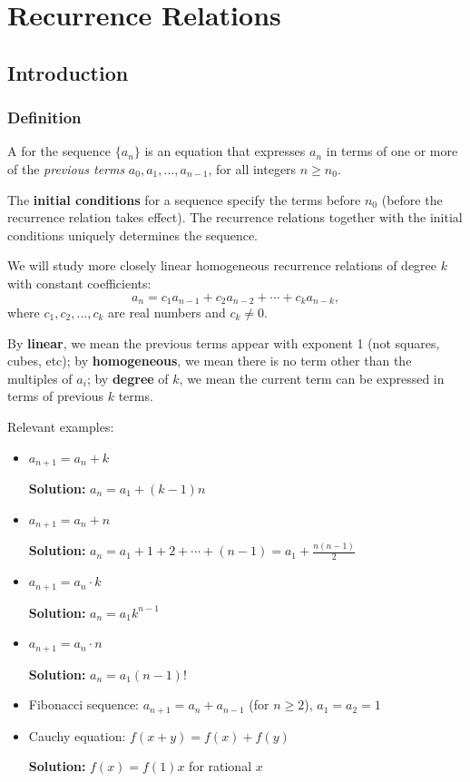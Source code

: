 \chapter{Recurrence Relations}

\section{Introduction}
\subsection{Definition}
\begin{definition}
A  for the sequence $\{a_n\}$ is an equation that expresses $a_n$ in terms of one or more of the \emph{previous terms} $a_0,a_1,\dots,a_{n-1}$, for all integers $n\ge n_0$.
\end{definition}

The \textbf{initial conditions} for a sequence specify the terms before $n_0$ (before the recurrence relation takes effect). The recurrence relations together with the initial conditions uniquely determines the sequence.

We will study more closely linear homogeneous recurrence relations of degree $k$ with constant coefficients:
\[ a_n=c_1a_{n-1}+c_2a_{n-2}+\cdots+c_ka_{n-k}, \]
where $c_1,c_2,\dots,c_k$ are real numbers and $c_k \neq 0$.

By \textbf{linear}, we mean the previous terms appear with exponent 1 (not squares, cubes, etc); by \textbf{homogeneous}, we mean there is no term other than the multiples of $a_i$; by \textbf{degree} of $k$, we mean the current term can be expressed in terms of previous $k$ terms.

Relevant examples:
\begin{itemize}
\item $a_{n+1}=a_n+k$

\textbf{Solution:} $a_n=a_1+(k-1)n$

\item $a_{n+1}=a_n+n$

\textbf{Solution:} $a_n=a_1+1+2+\cdots+(n-1)=a_1+\frac{n(n-1)}{2}$

\item $a_{n+1}=a_n \cdot k$

\textbf{Solution:} $a_n=a_1k^{n-1}$

\item $a_{n+1}=a_n \cdot n$

\textbf{Solution:} $a_n=a_1(n-1)!$

\item Fibonacci sequence: $a_{n+1}=a_n+a_{n-1}$ (for $n \ge 2$), $a_1=a_2=1$

\item Cauchy equation: $f(x+y)=f(x)+f(y)$

\textbf{Solution:} $f(x)=f(1)x$ for rational $x$

\end{itemize}

